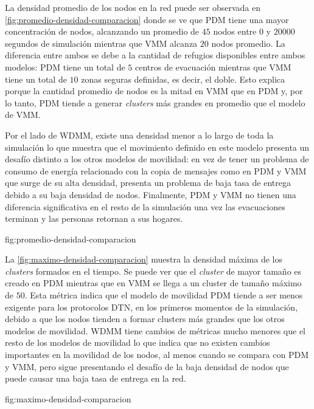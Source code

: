 La densidad promedio de los nodos en la red puede ser observada en
\ref{fig:promedio-densidad-comparacion} donde se ve que PDM tiene una mayor
concentración de nodos, alcanzando un promedio de $45$ nodos entre 0 y $20000$
segundos de simulación mientras que VMM alcanza $20$ nodos promedio. La
diferencia entre ambos se debe a la cantidad de refugios disponibles entre ambos
modelos: PDM tiene un total de $5$ centros de evacuación mientras que VMM
tiene un total de $10$ zonas seguras definidas, es decir, el doble. Esto explica
porque la cantidad promedio de nodos es la mitad en VMM que en PDM y, por
lo tanto, PDM tiende a generar \textit{clusters} más grandes en promedio que el
modelo de VMM. 

Por el lado de WDMM, existe una densidad menor a lo largo de toda la simulación
lo que muestra que el movimiento definido en este modelo presenta un desafío
distinto a los otros modelos de movilidad: en vez de tener un problema de
consumo de energía relacionado con la copia de mensajes como en PDM y VMM que
surge de su alta densidad, presenta un problema de baja tasa de entrega debido a
su baja densidad de nodos. Finalmente, PDM y VMM no tienen una diferencia
significativa en el resto de la simulación una vez las evacuaciones terminan y
las personas retornan a sus hogares.


{fig:promedio-densidad-comparacion}


La \ref{fig:maximo-densidad-comparacion} muestra la densidad máxima de los
\textit{clusters} formados en el tiempo. Se puede ver que el \textit{cluster} de
mayor tamaño es creado en PDM mientras que en VMM se llega a un cluster
de tamaño máximo de $50$. Esta métrica indica que el modelo de movilidad PDM
tiende a ser menos exigente para los protocolos DTN, en los primeros momentos de
la simulación, debido a que los nodos tienden a formar clusters más grandes que
los otros modelos de movilidad. WDMM tiene cambios de métricas mucho menores que
el resto de los modelos de movilidad lo que indica que no existen cambios
importantes en la movilidad de los nodos, al menos cuando se compara con PDM y
VMM, pero sigue presentando el desafío de la baja densidad de nodos que puede
causar una baja tasa de entrega en la red.



{fig:maximo-densidad-comparacion}


